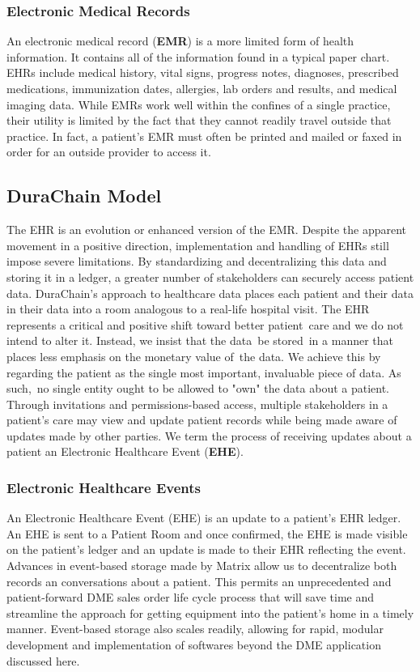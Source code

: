 \documentclass[letterpaper]{article}
\begin{document}
  \subsubsection{Electronic Medical Records}
  An electronic medical record (\textbf{EMR}) is a more limited form of health information. It contains all of the information found in a typical paper chart. EHRs include medical history, vital signs, progress notes, diagnoses, prescribed medications, immunization dates, allergies, lab orders and results, and medical imaging data. While EMRs work well within the confines of a single practice, their utility is limited by the fact that they cannot readily travel outside that practice. In fact, a patient's EMR must often be printed and mailed or faxed in order for an outside provider to access it.
%
\subsection{DuraChain Model}
The EHR is an evolution or enhanced version of the EMR. Despite the apparent movement in a positive direction, implementation and handling of EHRs still impose severe limitations. By standardizing and decentralizing this data and storing it in a ledger, a greater number of stakeholders can securely access patient data. DuraChain's approach to healthcare data places each patient and their data in their data into a room analogous to a real-life hospital visit.
%
The EHR represents a critical and positive shift toward better patient care and we do not intend to alter it. Instead, we insist that the data be stored in a manner that places less emphasis on the monetary value of the data.
%
We achieve this by regarding the patient as the single most important, invaluable piece of data. As such, no single entity ought to be allowed to "own" the data about a patient. Through invitations and permissions-based access, multiple stakeholders in a patient's care may view and update patient records while being made aware of updates made by other parties. We term the process of receiving updates about a patient an Electronic Healthcare Event (\textbf{EHE}).
%
  \subsubsection{Electronic Healthcare Events}
  An Electronic Healthcare Event (EHE) is an update to a patient’s EHR ledger. An EHE is sent to a Patient Room and once confirmed, the EHE is made visible on the patient’s ledger and an update is made to their EHR reflecting the event.
%
  Advances in event-based storage made by Matrix allow us to decentralize both records an conversations about a patient. This permits an unprecedented and patient-forward DME sales order life cycle process that will save time and streamline the approach for getting equipment into the patient's home in a timely manner.
%
  Event-based storage also scales readily, allowing for rapid, modular development and implementation of softwares beyond the DME application discussed here.
%
\end{document}
